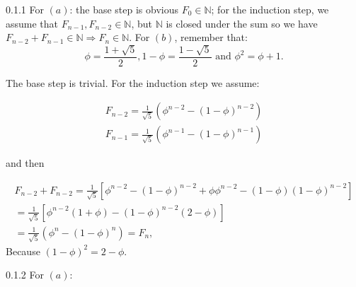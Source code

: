 



\begin{solexe}{0.1.1}
    For \( (a) \): the base step is obvious \( F_0 \in \mathbb{N} \); for the induction step,
    we assume that \(F_{n-1}, F_{n-2} \in \mathbb{N} \), but \(\mathbb{N}\) is closed under
    the sum so we have \(F_{n-2} + F_{n-1} \in \mathbb{N} \Rightarrow F_{n} \in \mathbb{N}\).
    \newline
    For \((b)\), remember that:
    \begin{equation*}
        \phi = \frac{1+\sqrt{5}}{2}, 1-\phi=\frac{1-\sqrt{5}}{2} \mbox{ and } \phi^2=\phi+1.
    \end{equation*}

    The base step is trivial. For the induction step we assume:

    \begin{equation*}
        \begin{aligned}
            F_{n-2} = \frac{1}{\sqrt{5}}
            \left(
                \phi^{n-2} - {(1-\phi)}^{n-2}
            \right) \\
            F_{n-1} = \frac{1}{\sqrt{5}}
            \left(
                \phi^{n-1} - {(1-\phi)}^{n-1}
            \right)
        \end{aligned}
    \end{equation*}

    and then

    \begin{equation*}
        \begin{aligned}
            F_{n-2} + F_{n-2} = \frac{1}{\sqrt{5}}
            \left[
                \phi^{n-2}-{(1-\phi)}^{n-2}+\phi\phi^{n-2}-(1-\phi){(1-\phi)}^{n-2}
            \right] \\
            = \frac{1}{\sqrt{5}}
            \left[
                \phi^{n-2}(1+\phi)-{(1-\phi)}^{n-2}(2-\phi)
            \right] \\
            = \frac{1}{\sqrt{5}}
            \left(
                \phi^n - {(1-\phi)}^n
            \right) = F_n,
        \end{aligned}
    \end{equation*}
    Because \( {(1-\phi)}^2=2-\phi \).

\end{solexe}

\begin{solexe}{0.1.2}
    For \( (a) \):
\end{solexe}
